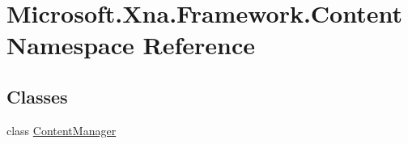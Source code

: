 \hypertarget{namespaceMicrosoft_1_1Xna_1_1Framework_1_1Content}{}\section{Microsoft.\+Xna.\+Framework.\+Content Namespace Reference}
\label{namespaceMicrosoft_1_1Xna_1_1Framework_1_1Content}
\subsection*{Classes}
\begin{DoxyCompactItemize}
\item 
class \hyperlink{classMicrosoft_1_1Xna_1_1Framework_1_1Content_1_1ContentManager}{Content\+Manager}
\end{DoxyCompactItemize}
